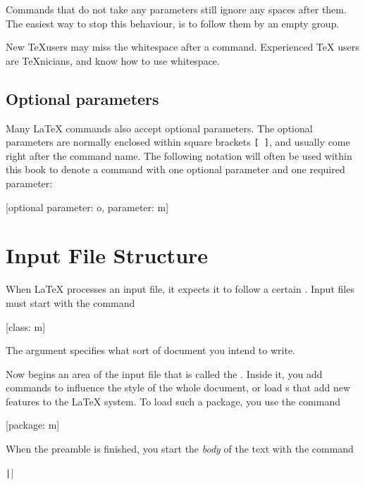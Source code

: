 Commands that do not take any parameters still ignore any spaces after them.
The easiest way to stop this behaviour, is to follow them by an empty group.

\begin{chktexignore}
  \begin{example}[examplewidth=0.45\linewidth]
New \TeX users may miss
the whitespace
after a command. %
Experienced \TeX{} users are
\TeX nicians, and know how to use
whitespace. %
\end{example}
\end{chktexignore}

\subsection{Optional parameters}

Many \LaTeX{} commands also accept optional parameters. The optional parameters
are normally enclosed
within square brackets \verb|[ ]|, and usually come right after the command
name. The following notation will often be used within this book to denote a
command with one optional parameter and one required parameter:
\begin{lscommand}
  [optional parameter: o, parameter: m]
\end{lscommand}

\section{Input File Structure}\label{sec:structure}
When \LaTeX{} processes an input file, it expects it to follow a
certain . Input files must start with the
command
\begin{code}
  [class: m]
\end{code}
The  argument specifies what sort of document you intend to write.

Now begins an area of the input file that is called the \emph{}.
Inside it, you add commands to influence the style of the whole document, or
load s that add new features to the \LaTeX{} system. To load such a
package, you use the command
\begin{code}
  [package: m]
\end{code}

When the preamble is finished, you start the \emph{body} of the text with the
command
\begin{code}
\texttt||
\end{code}

